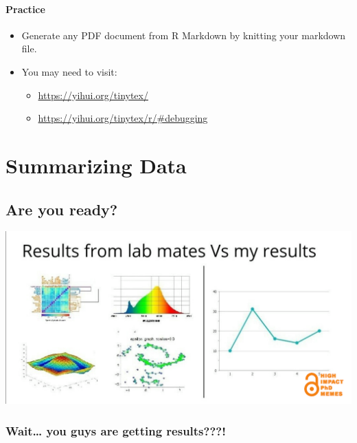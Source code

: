 \documentclass[
]{book}
\providecommand{\tightlist}{%
  \setlength{\itemsep}{0pt}\setlength{\parskip}{0pt}}
\begin{document}
\subsubsection{Practice}\label{practice}

\begin{itemize}
\tightlist
\item
  Generate any PDF document from R Markdown by knitting your markdown file.
\item
  You may need to visit:

  \begin{itemize}
  \tightlist
  \item
    \url{https://yihui.org/tinytex/}
  \item
    \url{https://yihui.org/tinytex/r/\#debugging}
  \end{itemize}
\end{itemize}

\chapter{Summarizing Data}\label{summarizing-data}

\section{Are you ready?}\label{are-you-ready}

\includegraphics{./img/fun_datvis_meme.png}

\subsection{Wait\ldots{} you guys are getting results???!}\label{wait-you-guys-are-getting-results}
\end{document}
